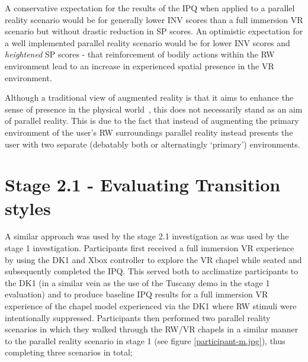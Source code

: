 A conservative expectation for the results of the IPQ when applied to a parallel reality scenario would be for generally lower INV scores than a full immersion VR scenario but without drastic reduction in SP scores. An optimistic expectation for a well implemented parallel reality scenario would be for lower INV scores and \textit{heightened} SP scores - that reinforcement of bodily actions within the RW environment lead to an increase in experienced spatial presence in the VR environment.

Although a traditional view of augmented reality is that it aims to enhance the sense of presence in the physical world~\cite{Waterworth2014}, this does not necessarily stand as an aim of parallel reality. This is due to the fact that instead of augmenting the primary environment of the user's RW surroundings parallel reality instead presents the user with two separate (debatably both or alternatingly `primary') environments.





\section{Stage 2.1 - Evaluating Transition styles}

A similar approach was used by the stage 2.1 investigation as was used by the stage 1 investigation. Participants first received a full immersion VR experience by using the DK1 and Xbox controller to explore the VR chapel while seated and subsequently completed the IPQ. This served both to acclimatize participants to the DK1 (in a similar vein as the use of the Tuscany demo in the stage 1 evaluation) and to produce baseline IPQ results for a full immersion VR experience of the chapel model experienced via the DK1 where RW stimuli were intentionally suppressed. Participants then performed two parallel reality scenarios in which they walked through the RW/VR chapels in a similar manner to the parallel reality scenario in stage 1 (see figure \ref{participant-m.jpg}), thus completing three scenarios in total;

